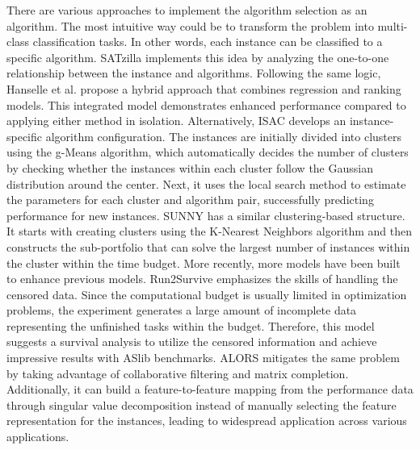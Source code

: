 \documentclass[preprint,review,12pt]{elsarticle}
\begin{document}
There are various approaches to implement the algorithm selection as an algorithm. The most intuitive way could be to transform the problem into multi-class classification tasks. In other words, each instance can be classified to a specific algorithm. SATzilla\cite{xu2008satzilla} implements this idea by analyzing the one-to-one relationship between the instance and algorithms. Following the same logic, Hanselle et al.\cite{hanselle2020hybrid} propose a hybrid approach that combines regression and ranking models. This integrated model demonstrates enhanced performance compared to applying either method in isolation. Alternatively, ISAC\cite{kadioglu2010isac} develops an instance-specific algorithm configuration. The instances are initially divided into clusters using the g-Means algorithm, which automatically decides the number of clusters by checking whether the instances within each cluster follow the Gaussian distribution around the center. Next, it uses the local search method to estimate the parameters for each cluster and algorithm pair, successfully predicting performance for new instances. SUNNY\cite{amadini2014sunny} has a similar clustering-based structure. It starts with creating clusters using the K-Nearest Neighbors algorithm and then constructs the sub-portfolio that can solve the largest number of instances within the cluster within the time budget. 
More recently, more models have been built to enhance previous models. Run2Survive\cite{tornede2020run2survive} emphasizes the skills of handling the censored data. Since the computational budget is usually limited in optimization problems, the experiment generates a large amount of incomplete data representing the unfinished tasks within the budget. Therefore, this model suggests a survival analysis to utilize the censored information and achieve impressive results with ASlib benchmarks. ALORS\cite{misir2022cross} mitigates the same problem by taking advantage of collaborative filtering and matrix completion. Additionally, it can build a feature-to-feature mapping from the performance data through singular value decomposition instead of manually selecting the feature representation for the instances, leading to widespread application across various applications.  
\end{document}
